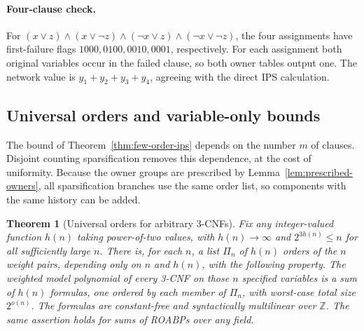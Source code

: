 \documentclass[11pt]{article}
\newtheorem{theorem}{Theorem}[section]
\theoremstyle{definition}
\theoremstyle{remark}
\begin{document}
\paragraph{Four-clause check.}
For $(x\vee z)\wedge(x\vee\neg z)\wedge
(\neg x\vee z)\wedge(\neg x\vee\neg z)$, the four assignments
have first-failure flags $1000,0100,0010,0001$, respectively.
For each assignment both original variables occur in the failed
clause, so both owner tables output one. The network value is
$y_1+y_2+y_3+y_4$, agreeing with the direct IPS calculation.

\subsection{Universal orders and variable-only bounds}

The bound of Theorem~\ref{thm:few-order-ips} depends on the number $m$
of clauses. Disjoint counting sparsification removes this dependence,
at the cost of uniformity. Because the owner groups are prescribed by
Lemma~\ref{lem:prescribed-owners}, all sparsification branches use
the same order list, so components with the same history can be added.

\begin{theorem}[Universal orders for arbitrary 3-CNFs]
\label{thm:universal-variable-order-wmc}
Fix any integer-valued function $h(n)$ taking power-of-two values,
with $h(n)\to\infty$ and $2^{3h(n)}\le n$ for all sufficiently
large $n$. There is, for each $n$, a list $\Pi_n$ of $h(n)$ orders
of the $n$ weight pairs, depending only on $n$ and $h(n)$, with the
following property. The weighted model polynomial of every 3-CNF
on those $n$ specified variables is a sum of $h(n)$ formulas, one
ordered by each member of $\Pi_n$, with worst-case total size
$2^{o(n)}$. The formulas are constant-free and syntactically
multilinear over $\mathbb Z$. The same assertion holds for sums of
ROABPs over any field.
\end{theorem}
\end{document}
